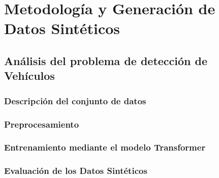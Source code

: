 \chapter{Metodología y Generación de Datos Sintéticos}

\section{Análisis del problema de detección de Vehículos}
\subsection{Descripción del conjunto de datos}
\subsection{Preprocesamiento}
\subsection{Entrenamiento mediante el modelo Transformer}
\subsection{Evaluación de los Datos Sintéticos}